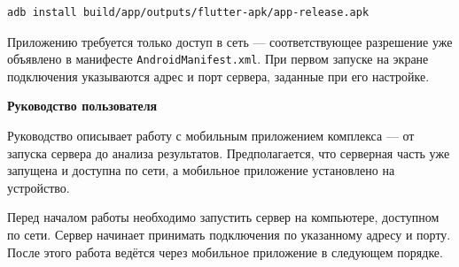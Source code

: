 \documentclass[14pt, a4paper]{extarticle}
\begin{document}
\begin{lstlisting}[language=bash]
adb install build/app/outputs/flutter-apk/app-release.apk
\end{lstlisting}

Приложению требуется только доступ в сеть --- соответствующее разрешение уже
объявлено в манифесте \texttt{AndroidManifest.xml}. При первом запуске на экране
подключения указываются адрес и порт сервера, заданные при его настройке.

\bigskip
\begin{center}\normalsize\bfseries Руководство пользователя\end{center}
\vspace{8pt}

Руководство описывает работу с мобильным приложением комплекса --- от запуска
сервера до анализа результатов. Предполагается, что серверная часть уже запущена
и доступна по сети, а мобильное приложение установлено на устройство.

Перед началом работы необходимо запустить сервер на компьютере, доступном по сети.
Сервер начинает принимать подключения по указанному адресу и порту. После этого
работа ведётся через мобильное приложение в следующем порядке.
\end{document}
